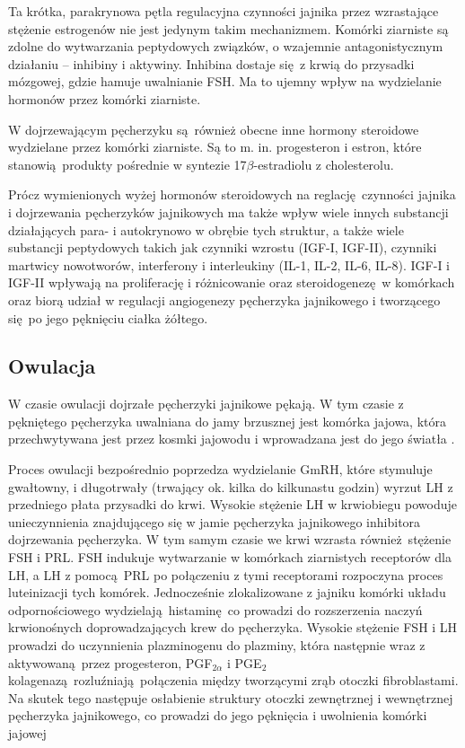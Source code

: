 \documentclass[two column, twoside, a4paper]{article}
\begin{document}
Ta krótka, parakrynowa pętla regulacyjna czynności jajnika przez wzrastające stężenie estrogenów nie jest jedynym takim mechanizmem. Komórki ziarniste są zdolne do wytwarzania peptydowych związków, o wzajemnie antagonistycznym działaniu -- inhibiny i aktywiny. Inhibina dostaje się z krwią do przysadki mózgowej, gdzie hamuje uwalnianie FSH. Ma to ujemny wpływ na wydzielanie hormonów przez komórki ziarniste. \autocite{Krzymowski2005, Woodruff1995, Findlay1993}

W dojrzewającym pęcherzyku są również obecne inne hormony steroidowe wydzielane przez komórki ziarniste. Są to m. in. progesteron i estron, które stanowią produkty pośrednie w syntezie 17$\beta$-estradiolu z cholesterolu.

Prócz wymienionych wyżej hormonów steroidowych na reglację czynności jajnika i dojrzewania pęcherzyków jajnikowych ma także wpływ wiele innych substancji działających para- i autokrynowo w obrębie tych struktur, a także wiele substancji peptydowych takich jak czynniki wzrostu (IGF-I, IGF-II), czynniki martwicy nowotworów, interferony i interleukiny (IL-1, IL-2, IL-6, IL-8). IGF-I i IGF-II wpływają na proliferację i różnicowanie oraz steroidogenezę w komórkach oraz biorą udział w regulacji angiogenezy pęcherzyka jajnikowego i tworzącego się po jego pęknięciu ciałka żółtego. \autocite{Krzymowski2005, Erickson1990, Gottshall1987, Alpizar1994}

\subsection{Owulacja}

W czasie owulacji dojrzałe pęcherzyki jajnikowe pękają. W tym czasie z pękniętego pęcherzyka uwalniana do jamy brzusznej jest komórka jajowa, która przechwytywana jest przez kosmki jajowodu i wprowadzana jest do jego światła \autocite{Sawicki2017}.

Proces owulacji bezpośrednio poprzedza wydzielanie GmRH, które stymuluje gwałtowny, i długotrwały (trwający ok. kilka do kilkunastu godzin) wyrzut LH z przedniego płata przysadki do krwi. Wysokie stężenie LH w krwiobiegu powoduje unieczynnienia znajdującego się w jamie pęcherzyka jajnikowego inhibitora dojrzewania pęcherzyka. W tym samym czasie we krwi wzrasta również stężenie FSH i PRL. FSH indukuje wytwarzanie w komórkach ziarnistych receptorów dla LH, a LH z pomocą PRL po połączeniu z tymi receptorami rozpoczyna proces luteinizacji tych komórek. Jednocześnie zlokalizowane z jajniku komórki układu odpornościowego wydzielają histaminę co prowadzi do rozszerzenia naczyń krwionośnych doprowadzających krew do pęcherzyka. Wysokie stężenie FSH i LH prowadzi do uczynnienia plazminogenu do plazminy, która następnie wraz z aktywowaną przez progesteron, PGF$_{2\alpha}$ i PGE$_{2}$ kolagenazą rozluźniają połączenia między tworzącymi zrąb otoczki fibroblastami. Na skutek tego następuje osłabienie struktury otoczki zewnętrznej i wewnętrznej pęcherzyka jajnikowego, co prowadzi do jego pęknięcia i uwolnienia komórki jajowej \autocite{Krzymowski2005,Sawicki2017}
\end{document}
